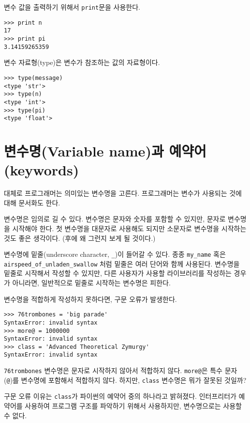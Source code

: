 변수 값을 출력하기 위해서 {\tt print}문을 사용한다.

\beforeverb
\begin{verbatim}
>>> print n
17
>>> print pi
3.14159265359
\end{verbatim}
\afterverb
%

변수 자료형(type)은 변수가 참조하는 값의 자료형이다.

\beforeverb
\begin{verbatim}
>>> type(message)
<type 'str'>
>>> type(n)
<type 'int'>
>>> type(pi)
<type 'float'>
\end{verbatim}
\afterverb
%

\section{변수명(Variable name)과 예약어(keywords)}

대체로 프로그래머는 의미있는 변수명을 고른다. 프로그래머는 변수가 사용되는 것에 대해 문서화도 한다.

변수명은 임의로 길 수 있다. 변수명은 문자와 숫자를 포함할 수 있지만, 문자로 변수명을 시작해야 한다. 첫 변수명을 대문자로 사용해도 되지만 소문자로 변수명을 시작하는 것도 좋은 생각이다. (후에 왜 그런지 보게 될 것이다.)

변수명에 밑줄(underscore character, \verb"_")이 들어갈 수 있다. 종종 \verb"my_name" 혹은 \verb"airspeed_of_unladen_swallow" 처럼 밑줄은 여러 단어와 함께 사용된다.
변수명을 밑줄로 시작해서 작성할 수 있지만, 다른 사용자가 사용할 라이브러리를 작성하는 경우가 아니라면, 일반적으로 밑줄로 시작하는 변수명은 피한다.


변수명을 적합하게 작성하지 못하다면, 구문 오류가 발생한다.

\beforeverb
\begin{verbatim}
>>> 76trombones = 'big parade'
SyntaxError: invalid syntax
>>> more@ = 1000000
SyntaxError: invalid syntax
>>> class = 'Advanced Theoretical Zymurgy'
SyntaxError: invalid syntax
\end{verbatim}
\afterverb
%

{\tt 76trombones} 변수명은 문자로 시작하지 않아서 적합하지 않다. 
{\tt more@}은 특수 문자 ({\tt @})를 변수명에 포함해서 적합하지 않다. 
하지만, {\tt class} 변수명은 뭐가 잘못된 것일까?

구문 오류 이유는 {\tt class}가 파이썬의 예약어 중의 하나라고 밝혀졌다. 
인터프리터가 예약어를 사용하여 프로그램 구조를 파악하기 위해서 사용하지만, 변수명으로는 사용할 수 없다.

